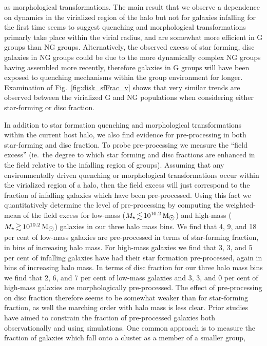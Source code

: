 \documentclass[a4paper,fleqn,usenatbib]{mnras}
\newcommand{\Msun}{\,\mathrm{M_{\sun}}}
\begin{document}
as morphological transformations.  The main result that we observe a
dependence on dynamics in the virialized region of the halo but not
for galaxies infalling for the first time seems to suggest quenching and
morphological transformations primarly take
place within the virial radius, and are somewhat more efficient in G
groups than NG groups.  Alternatively, the observed excess of star
forming, disc galaxies in NG groups could be due to the more
dynamically complex NG groups having assembled more recently,
therefore galaxies in G groups will have been exposed to quenching
mechanisms within the group environment for longer.  Examination of
Fig.~\ref{fig:disk_sfFrac_v} shows that very similar trends are observed
between the virialized G and NG populations when considering either
star-forming or disc fraction.
\par
In addition to star formation quenching and morphological
transformations within the current host halo, we also find evidence
for pre-processing in both star-forming and disc fraction.  To probe
pre-processing we measure the ``field excess'' (ie.\ the degree to
which star forming and disc fractions are enhanced in the field
relative to the infalling region of groups).  Assuming that any
environmentally driven quenching or morphological transformations occur within the virialized region of a halo,
then the field excess will just correspond to the fraction of
infalling galaxies which have been pre-processed.  Using this fact we
quantitatively determine the level of pre-processing by computing the
weighted-mean of the field excess for low-mass ($M_\star \la
10^{10.2}\Msun$) and high-mass  ($M_\star \ga 10^{10.2}\Msun$)
galaxies in our three halo mass bins.
We find that 4, 9, and 18 per cent of low-mass galaxies are pre-processed
in terms of star-forming fraction, in bins of increasing halo mass.
For high-mass galaxies we find that 3,
3, and 5 per cent of infalling galaxies have had their star formation
pre-processed, again in bins of
increasing halo mass.  In terms of disc fraction for our three halo
mass bins we find that 2, 6,
and 7 per cent of low-mass galaxies and 3, 3, and 0 per cent of
high-mass galaxies are morphologically pre-processed.  The effect of
pre-processing on disc fraction therefore seems to be somewhat weaker than for
star-forming fraction, as well the marching order with halo mass is
less clear. 
Prior studies have aimed to constrain the
fraction of pre-processed galaxies both observationally and using
simulations.  One common approach is to measure the fraction of
galaxies which fall onto a cluster as a member of a smaller group,
\end{document}
